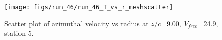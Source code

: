 \begin{figure}[H]
\centering
\texttt{[image: figs/run\_46/run\_46\_T\_vs\_r\_meshscatter]}
\caption{Scatter plot of azimuthal velocity vs radius at $z/c$=9.00, $V_{free}$=24.9, station 5.}
\label{fig:run_46_T_vs_r_meshscatter}
\end{figure}



